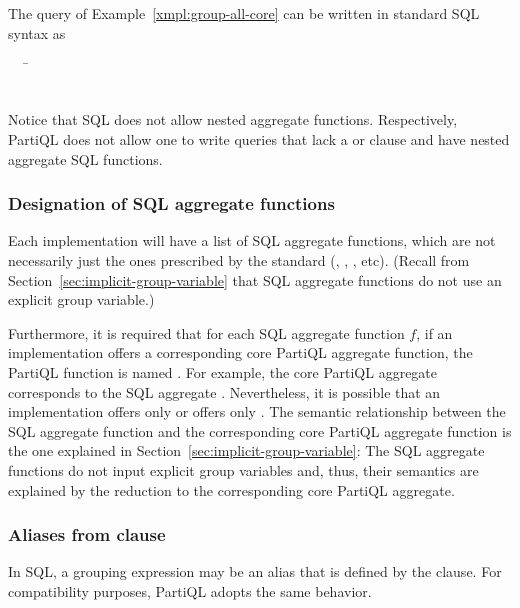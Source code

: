 \begin{example}
\label{xmpl:group-by-nothing-sql}
The query of Example~\ref{xmpl:group-all-core} can be written in standard SQL
syntax as
\begin{tabbing}
\ \ \ \=\\
\>\\
\>
\end{tabbing}
\end{example}

Notice that SQL does not allow nested aggregate functions. Respectively, PartiQL
does not allow one to write queries that lack a  or 
clause and have nested aggregate SQL functions.

\subsubsection{Designation of SQL aggregate functions}
\label{sec:SQL-aggregation-functions}

Each implementation will have a list of SQL aggregate functions, which are not
necessarily just the ones prescribed by the standard (, ,
, etc). (Recall from Section~\ref{sec:implicit-group-variable} that SQL
aggregate functions do not use an explicit group variable.)

Furthermore, it is required that for each SQL aggregate function $f$, if an
implementation offers a corresponding core PartiQL aggregate function, the
PartiQL function is named . For example, the core PartiQL
aggregate  corresponds to the SQL aggregate .
Nevertheless, it is possible that an implementation offers only 
or offers only . The semantic relationship between the SQL aggregate
function and the corresponding core PartiQL aggregate function is the one
explained in Section~\ref{sec:implicit-group-variable}: The SQL aggregate
functions do not input explicit group variables and, thus, their semantics are
explained by the reduction to the corresponding core PartiQL aggregate.

\subsubsection{Aliases from  clause}
\label{sec:select-aliases-groupby}

In SQL, a grouping expression may be an alias that is defined by the 
clause. For compatibility purposes, PartiQL adopts the same behavior. 

